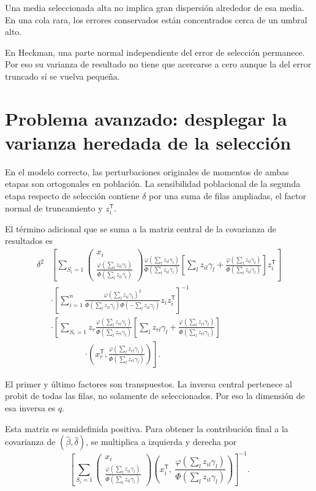\documentclass[11pt,a4paper]{article}
\newcommand{\T}{^{\mathsf T}}
\begin{document}
Una media seleccionada alta
no implica gran dispersión
alrededor de esa media.
En una cola rara,
los errores conservados
están concentrados cerca
de un umbral alto.

En Heckman, una parte
normal independiente del
error de selección permanece.
Por eso su varianza
de resultado no tiene
que acercarse a cero
aunque la del
error truncado sí
se vuelva pequeña.

\clearpage
\section{Problema avanzado: desplegar la varianza heredada de la selección}\label{unidad177}
En el modelo correcto, las perturbaciones originales de
momentos de ambas etapas son ortogonales en población.
La sensibilidad poblacional de la segunda etapa respecto
de selección contiene \(\delta\) por una suma de
filas ampliadas, el factor normal de truncamiento y \(z_i\T\).

El término adicional que se suma a la matriz central
de la covarianza de resultados es
\[
\begin{aligned}
\delta^2&
\left[\sum_{S_i=1}
\begin{pmatrix}x_i\\\frac{\varphi(\sum_lz_{il}\gamma_l)}{\Phi(\sum_lz_{il}\gamma_l)}\end{pmatrix}
\frac{\varphi(\sum_lz_{il}\gamma_l)}{\Phi(\sum_lz_{il}\gamma_l)}\left[\sum_lz_{il}\gamma_l+\frac{\varphi(\sum_lz_{il}\gamma_l)}{\Phi(\sum_lz_{il}\gamma_l)}\right]z_i\T\right]\\
&\cdot\left[\sum_{i=1}^n
\frac{\varphi(\sum_lz_{il}\gamma_l)^2}
{\Phi(\sum_lz_{il}\gamma_l)\Phi(-\sum_lz_{il}\gamma_l)}
z_iz_i\T\right]^{-1}\\
&\cdot\left[\sum_{S_r=1}
z_r\frac{\varphi(\sum_lz_{rl}\gamma_l)}
{\Phi(\sum_lz_{rl}\gamma_l)}
\left[\sum_lz_{rl}\gamma_l+
\frac{\varphi(\sum_lz_{rl}\gamma_l)}
{\Phi(\sum_lz_{rl}\gamma_l)}\right]\right.\\
&\qquad\qquad\left.\cdot
\left(x_r\T,\frac{\varphi(\sum_lz_{rl}\gamma_l)}
{\Phi(\sum_lz_{rl}\gamma_l)}\right)\right].
\end{aligned}
\]

El primer y último factores son transpuestos.
La inversa central pertenece al probit de todas las filas,
no solamente de seleccionados.
Por eso la dimensión de esa inversa es \(q\).

Esta matriz es semidefinida positiva.
Para obtener la contribución final a la covarianza
de \((\widehat\beta,\widehat\delta)\),
se multiplica a izquierda y derecha por
\[
\left[\sum_{S_i=1}\begin{pmatrix}x_i\\\frac{\varphi(\sum_lz_{il}\gamma_l)}{\Phi(\sum_lz_{il}\gamma_l)}\end{pmatrix}\left(x_i\T,\ \frac{\varphi(\sum_lz_{il}\gamma_l)}{\Phi(\sum_lz_{il}\gamma_l)}\right)\right]^{-1}.
\]
\end{document}
